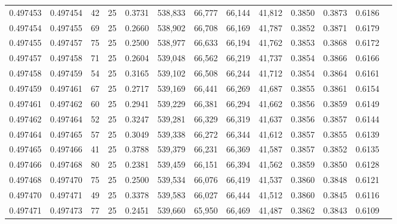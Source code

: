 \begin{tabular}{rrrrrrrrrrrrr}
0.497453 & 0.497454 &    42 &  25 &                                     0.3731 & 538,833 &  66,777 &  66,144 &  41,812 & 0.3850 & 0.3873 & 0.6186 \\
0.497454 & 0.497455 &    69 &  25 &                                     0.2660 & 538,902 &  66,708 &  66,169 &  41,787 & 0.3852 & 0.3871 & 0.6179 \\
0.497455 & 0.497457 &    75 &  25 &                                     0.2500 & 538,977 &  66,633 &  66,194 &  41,762 & 0.3853 & 0.3868 & 0.6172 \\
0.497457 & 0.497458 &    71 &  25 &                                     0.2604 & 539,048 &  66,562 &  66,219 &  41,737 & 0.3854 & 0.3866 & 0.6166 \\
0.497458 & 0.497459 &    54 &  25 &                                     0.3165 & 539,102 &  66,508 &  66,244 &  41,712 & 0.3854 & 0.3864 & 0.6161 \\
0.497459 & 0.497461 &    67 &  25 &                                     0.2717 & 539,169 &  66,441 &  66,269 &  41,687 & 0.3855 & 0.3861 & 0.6154 \\
0.497461 & 0.497462 &    60 &  25 &                                     0.2941 & 539,229 &  66,381 &  66,294 &  41,662 & 0.3856 & 0.3859 & 0.6149 \\
0.497462 & 0.497464 &    52 &  25 &                                     0.3247 & 539,281 &  66,329 &  66,319 &  41,637 & 0.3856 & 0.3857 & 0.6144 \\
0.497464 & 0.497465 &    57 &  25 &                                     0.3049 & 539,338 &  66,272 &  66,344 &  41,612 & 0.3857 & 0.3855 & 0.6139 \\
0.497465 & 0.497466 &    41 &  25 &                                     0.3788 & 539,379 &  66,231 &  66,369 &  41,587 & 0.3857 & 0.3852 & 0.6135 \\
0.497466 & 0.497468 &    80 &  25 &                                     0.2381 & 539,459 &  66,151 &  66,394 &  41,562 & 0.3859 & 0.3850 & 0.6128 \\
0.497468 & 0.497470 &    75 &  25 &                                     0.2500 & 539,534 &  66,076 &  66,419 &  41,537 & 0.3860 & 0.3848 & 0.6121 \\
0.497470 & 0.497471 &    49 &  25 &                                     0.3378 & 539,583 &  66,027 &  66,444 &  41,512 & 0.3860 & 0.3845 & 0.6116 \\
0.497471 & 0.497473 &    77 &  25 &                                     0.2451 & 539,660 &  65,950 &  66,469 &  41,487 & 0.3862 & 0.3843 & 0.6109 \\

\end{tabular}
